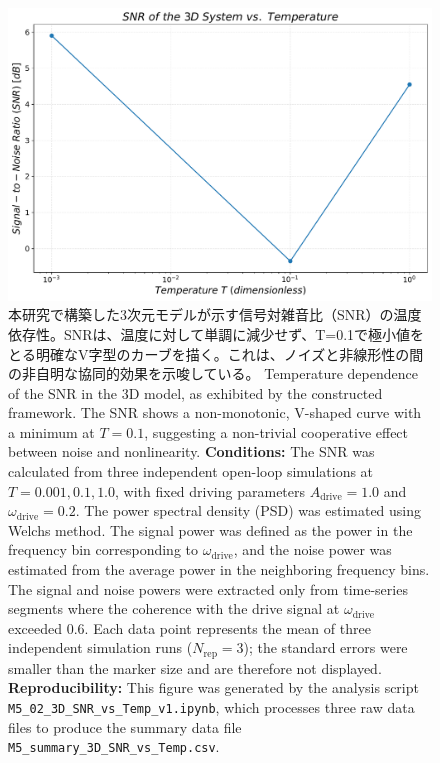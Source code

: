 \documentclass[a4paper,11pt,ja=standard,lualatex]{bxjsarticle}
\begin{document}
\begin{figure}[htbp]
    \centering
    \includegraphics[width=0.8\linewidth]{M5_Fig4_3D_SNR_vs_Temperature_EN.pdf}
    \caption{本研究で構築した3次元モデルが示す信号対雑音比（SNR）の温度依存性。SNRは、温度に対して単調に減少せず、T=0.1で極小値をとる明確なV字型のカーブを描く。これは、ノイズと非線形性の間の非自明な協同的効果を示唆している。
    \newline\newline
    Temperature dependence of the SNR in the 3D model, as exhibited by the constructed framework. The SNR shows a non-monotonic, V-shaped curve with a minimum at $T=0.1$, suggesting a non-trivial cooperative effect between noise and nonlinearity.
    \newline\newline
    \textbf{Conditions:} The SNR was calculated from three independent open-loop simulations at $T = 0.001, 0.1, 1.0$, with fixed driving parameters $A_{\mathrm{drive}} = 1.0$ and $\omega_{\mathrm{drive}} = 0.2$. The power spectral density (PSD) was estimated using Welch\textquotesingle s method. The signal power was defined as the power in the frequency bin corresponding to $\omega_{\mathrm{drive}}$, and the noise power was estimated from the average power in the neighboring frequency bins. The signal and noise powers were extracted only from time-series segments where the coherence with the drive signal at $\omega_{\mathrm{drive}}$ exceeded 0.6. Each data point represents the mean of three independent simulation runs ($N_{\mathrm{rep}}=3$); the standard errors were smaller than the marker size and are therefore not displayed.
    \textbf{Reproducibility:} This figure was generated by the analysis script \texttt{M5\_02\_3D\_SNR\_vs\_Temp\_v1.ipynb}, which processes three raw data files to produce the summary data file \texttt{M5\_summary\_3D\_SNR\_vs\_Temp.csv}.}
    \label{fig:snr_vs_temp_3d}
\end{figure}
\end{document}
